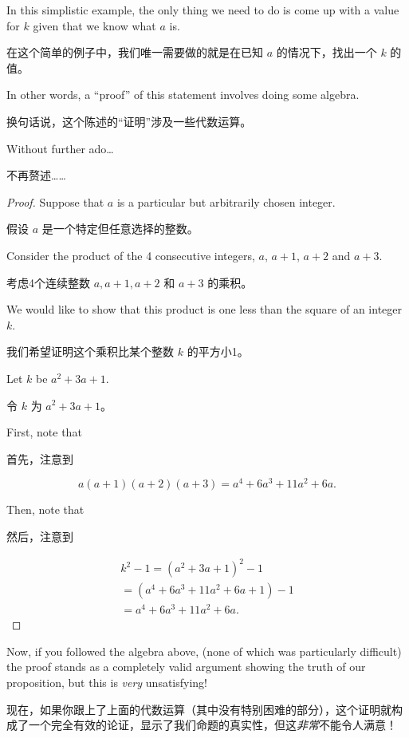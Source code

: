 In this simplistic example, the only thing we need to do is come
up with a value for $k$ given that we know what $a$ is.

在这个简单的例子中，我们唯一需要做的就是在已知 $a$ 的情况下，找出一个 $k$ 的值。

In other
words, a ``proof'' of this statement involves doing some algebra.

换句话说，这个陈述的“证明”涉及一些代数运算。

Without further ado\ldots

不再赘述……

\begin{proof}
      Suppose that $a$ is a particular but arbitrarily chosen
      integer.

      假设 $a$ 是一个特定但任意选择的整数。

      Consider the product of the 4 consecutive integers, $a$,
      $a+1$, $a+2$ and $a+3$.

      考虑4个连续整数 $a, a+1, a+2$ 和 $a+3$ 的乘积。

      We would like to show that this product is
      one less than the square of an integer $k$.

      我们希望证明这个乘积比某个整数 $k$ 的平方小1。

      Let $k$ be $a^2+3a+1$.

      令 $k$ 为 $a^2+3a+1$。

      First, note that

      首先，注意到

      \[  a(a+1)(a+2)(a+3) = a^4 + 6a^3 + 11a^2 + 6a.
      \]

      Then, note that

      然后，注意到

      \begin{gather*}
            k^2 - 1 = (a^2 + 3a +1)^2 - 1 \\
            = (a^4  + 6a^3 + 11a^2 + 6a + 1) - 1 \\
            = a^4 + 6a^3 + 11a^2 + 6a.
      \end{gather*}

\end{proof}

Now, if you followed the algebra above, (none of which was particularly
difficult) the proof stands as a completely valid argument showing the
truth of our proposition, but this is \emph{very} unsatisfying!

现在，如果你跟上了上面的代数运算（其中没有特别困难的部分），这个证明就构成了一个完全有效的论证，显示了我们命题的真实性，但这\emph{非常}不能令人满意！

